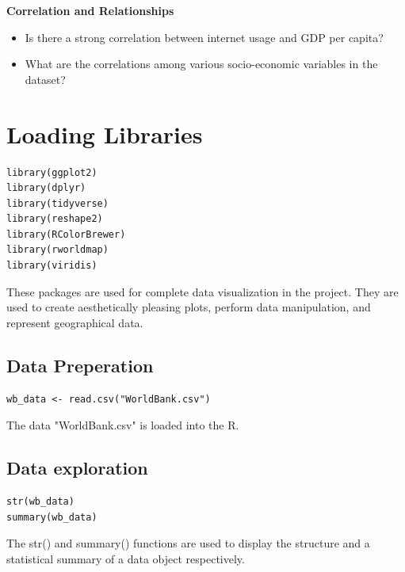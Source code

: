 \documentclass{article}\usepackage[]{graphicx}\usepackage[]{xcolor}
\begin{document}
\textbf{Correlation and Relationships}

\begin{itemize}
    \item Is there a strong correlation between internet usage and GDP per capita?
    \item What are the correlations among various socio-economic variables in the dataset?
\end{itemize}

\newpage

\section{Loading Libraries}

\begin{lstlisting}
library(ggplot2)
library(dplyr)
library(tidyverse)
library(reshape2)
library(RColorBrewer)
library(rworldmap)
library(viridis)
\end{lstlisting}
These packages are used for complete data visualization in the project. They are used to create aesthetically pleasing plots, perform data manipulation, and represent geographical data.





\subsection{Data Preperation}
\begin{lstlisting}
wb_data <- read.csv("WorldBank.csv")
\end{lstlisting}

The data "WorldBank.csv" is loaded into the R.

\subsection{Data exploration}
\begin{lstlisting}
str(wb_data)
summary(wb_data)
\end{lstlisting}

The str() and summary() functions  are used to display the structure and a statistical summary of a data object respectively.
\end{document}
